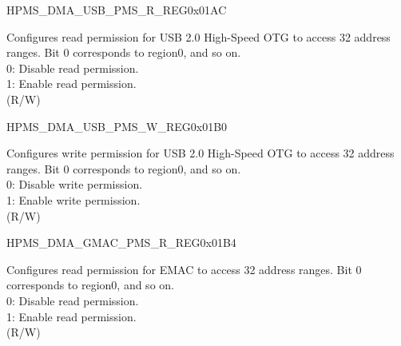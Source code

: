 \begin{register}{H}{PMS\_DMA\_USB\_PMS\_R\_REG}{0x01AC}\label{regdesc:PMSDMAUSBPMSRREG}
%
\regnewline%
\begin{regdesc}\begin{reglist}
\label{fielddesc:PMSDMAUSBRPMS}\item [PMS\_DMA\_USB\_R\_PMS] Configures read permission for USB 2.0 High-Speed OTG to access 32 address ranges. Bit 0 corresponds to region0, and so on.\\
0: Disable read permission.\\
1: Enable read permission.\\ (R/W)
\end{reglist}\end{regdesc}
\end{register}


\begin{register}{H}{PMS\_DMA\_USB\_PMS\_W\_REG}{0x01B0}\label{regdesc:PMSDMAUSBPMSWREG}
%
\regnewline%
\begin{regdesc}\begin{reglist}
\label{fielddesc:PMSDMAUSBWPMS}\item [PMS\_DMA\_USB\_W\_PMS] Configures write permission for USB 2.0 High-Speed OTG to access 32 address ranges. Bit 0 corresponds to region0, and so on.\\
0: Disable write permission.\\
1: Enable write permission.\\ (R/W)
\end{reglist}\end{regdesc}
\end{register}


\begin{register}{H}{PMS\_DMA\_GMAC\_PMS\_R\_REG}{0x01B4}\label{regdesc:PMSDMAGMACPMSRREG}
%
\regnewline%
\begin{regdesc}\begin{reglist}
\label{fielddesc:PMSDMAGMACRPMS}\item [PMS\_DMA\_GMAC\_R\_PMS] Configures read permission for EMAC to access 32 address ranges. Bit 0 corresponds to region0, and so on.\\
0: Disable read permission.\\
1: Enable read permission.\\ (R/W)
\end{reglist}\end{regdesc}
\end{register}


